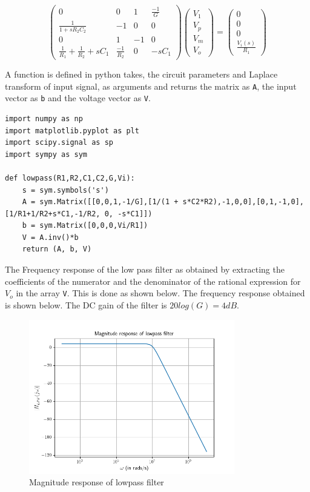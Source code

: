 \documentclass[12pt, a4paper]{article}
\begin{document}
\begin{equation*}
\left(
\begin{matrix}
0 & 0 & 1 & \frac{-1}{G} \\
\frac{1}{1+sR_2C_2} & -1 & 0 & 0 \\
0 & 1 & -1 & 0 \\
\frac{1}{R_1}+\frac{1}{R_2}+sC_1 & \frac{-1}{R_2} & 0 & -sC_1
\end{matrix}
\right)
\left(
\begin{matrix}
V_1 \\
V_p \\
V_m \\
V_o
\end{matrix}
\right) = 
\left(
\begin{matrix}
0 \\
0 \\
0 \\
\frac{V_i(s)}{R_1}
\end{matrix}
\right)
\end{equation*}

A function is defined in python takes, the circuit parameters and Laplace transform of input signal, as arguments and returns the matrix as \texttt{A}, the input vector as \texttt{b} and the voltage vector as \texttt{V}.

\begin{lstlisting}
import numpy as np
import matplotlib.pyplot as plt
import scipy.signal as sp
import sympy as sym

def lowpass(R1,R2,C1,C2,G,Vi):
    s = sym.symbols('s')
    A = sym.Matrix([[0,0,1,-1/G],[1/(1 + s*C2*R2),-1,0,0],[0,1,-1,0],[1/R1+1/R2+s*C1,-1/R2, 0, -s*C1]])
    b = sym.Matrix([0,0,0,Vi/R1])
    V = A.inv()*b
    return (A, b, V)
\end{lstlisting}

The Frequency response of the low pass filter as obtained by extracting the coefficients of the numerator and the denominator of the rational expression for $V_o$ in the array \texttt{V}. This is done as shown below.
The frequency response obtained is shown below. The DC gain of the filter is $20log(G) = 4dB$.

\begin{figure}[H]
\centering
\includegraphics[width=0.8\textwidth]{magResLPF.png}
\caption{Magnitude response of lowpass filter}
\end{figure}
\end{document}
